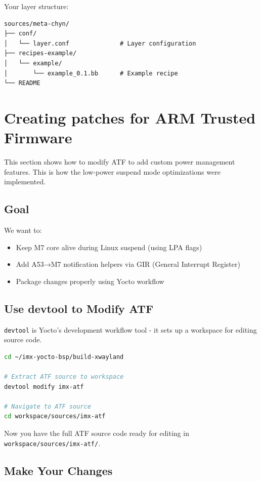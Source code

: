 \documentclass[12pt,a4paper]{report}
\begin{document}
Your layer structure:

\begin{lstlisting}
sources/meta-chyn/
├── conf/
│   └── layer.conf              # Layer configuration
├── recipes-example/
│   └── example/
│       └── example_0.1.bb      # Example recipe
└── README
\end{lstlisting}

\section{Creating patches for ARM Trusted Firmware}

This section shows how to modify ATF to add custom power management features. This is how the low-power suspend mode optimizations were implemented.

\subsection{Goal}

We want to:
\begin{itemize}
    \item Keep M7 core alive during Linux suspend (using LPA flags)
    \item Add A53→M7 notification helpers via GIR (General Interrupt Register)
    \item Package changes properly using Yocto workflow
\end{itemize}

\subsection{Use devtool to Modify ATF}

\texttt{devtool} is Yocto's development workflow tool - it sets up a workspace for editing source code.

\begin{lstlisting}[language=bash]
cd ~/imx-yocto-bsp/build-xwayland

# Extract ATF source to workspace
devtool modify imx-atf

# Navigate to ATF source
cd workspace/sources/imx-atf
\end{lstlisting}

Now you have the full ATF source code ready for editing in \texttt{workspace/sources/imx-atf/}.

\subsection{Make Your Changes}
\end{document}
